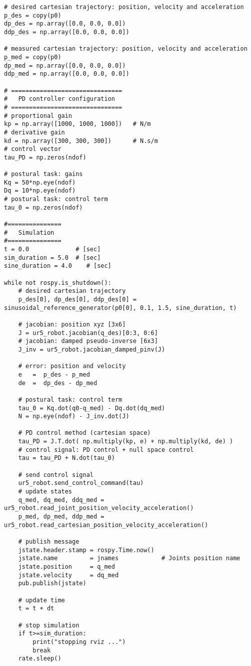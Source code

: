 \begin{lstlisting}
# desired cartesian trajectory: position, velocity and acceleration
p_des = copy(p0)
dp_des = np.array([0.0, 0.0, 0.0])
ddp_des = np.array([0.0, 0.0, 0.0])

# measured cartesian trajectory: position, velocity and acceleration
p_med = copy(p0)
dp_med = np.array([0.0, 0.0, 0.0])
ddp_med = np.array([0.0, 0.0, 0.0])

# ===============================
#   PD controller configuration
# ===============================
# proportional gain
kp = np.array([1000, 1000, 1000])   # N/m
# derivative gain   
kd = np.array([300, 300, 300])      # N.s/m
# control vector
tau_PD = np.zeros(ndof)    

# postural task: gains
Kq = 50*np.eye(ndof)
Dq = 10*np.eye(ndof)
# postural task: control term
tau_0 = np.zeros(ndof)

#===============
#   Simulation
#===============
t = 0.0             # [sec] 
sim_duration = 5.0  # [sec]
sine_duration = 4.0    # [sec]

while not rospy.is_shutdown():
    # desired cartesian trajectory
    p_des[0], dp_des[0], ddp_des[0] = sinusoidal_reference_generator(p0[0], 0.1, 1.5, sine_duration, t)

    # jacobian: position xyz [3x6]
    J = ur5_robot.jacobian(q_des)[0:3, 0:6]  
    # jacobian: damped pseudo-inverse [6x3]
    J_inv = ur5_robot.jacobian_damped_pinv(J)   

    # error: position and velocity
    e 	=  p_des - p_med
    de 	=  dp_des - dp_med    

    # postural task: control term
    tau_0 = Kq.dot(q0-q_med) - Dq.dot(dq_med)
    N = np.eye(ndof) - J_inv.dot(J)
    
    # PD control method (cartesian space)
    tau_PD = J.T.dot( np.multiply(kp, e) + np.multiply(kd, de) )
    # control signal: PD control + null space control
    tau = tau_PD + N.dot(tau_0)
    
    # send control signal
    ur5_robot.send_control_command(tau)
    # update states
    q_med, dq_med, ddq_med = ur5_robot.read_joint_position_velocity_acceleration()
    p_med, dp_med, ddp_med = ur5_robot.read_cartesian_position_velocity_acceleration()

    # publish message
    jstate.header.stamp = rospy.Time.now()
    jstate.name 		= jnames			# Joints position name
    jstate.position 	= q_med
    jstate.velocity 	= dq_med
    pub.publish(jstate)

    # update time
    t = t + dt
    
    # stop simulation
    if t>=sim_duration:
        print("stopping rviz ...")
        break
    rate.sleep()
\end{lstlisting}

